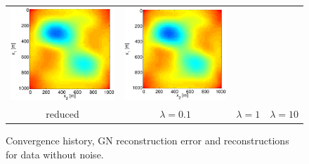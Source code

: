 \documentclass{iopart}
\begin{document}
\begin{figure}
\begin{tabular}{cccc}
\includegraphics[scale=.2]{./figs/2D_exp1_g}&
\includegraphics[scale=.2]{./figs/2D_exp1_h}\\
{\small reduced}&{\small $\lambda=0.1$}&{\small $\lambda=1$}&{\small $\lambda=10$}\\
\end{tabular}
\caption{Convergence history, GN reconstruction error and reconstructions for data without noise.}
\label{fig:2D_exp1}
\end{figure}
\end{document}
